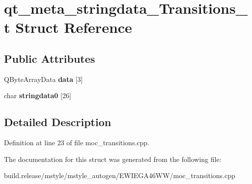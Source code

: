 \hypertarget{structqt__meta__stringdata___transitions__t}{}\section{qt\+\_\+meta\+\_\+stringdata\+\_\+\+Transitions\+\_\+t Struct Reference}
\label{structqt__meta__stringdata___transitions__t}
\subsection*{Public Attributes}
\begin{DoxyCompactItemize}
\item 
\mbox{\label{structqt__meta__stringdata___transitions__t_a26a5255698e0638a6a36d127ac968121}} 
Q\+Byte\+Array\+Data {\bfseries data} \mbox{[}3\mbox{]}
\item 
\mbox{\label{structqt__meta__stringdata___transitions__t_a0359efe1881ab36603b3039813944c89}} 
char {\bfseries stringdata0} \mbox{[}26\mbox{]}
\end{DoxyCompactItemize}


\subsection{Detailed Description}


Definition at line 23 of file moc\+\_\+transitions.\+cpp.



The documentation for this struct was generated from the following file\+:\begin{DoxyCompactItemize}
\item 
build.\+release/mstyle/mstyle\+\_\+autogen/\+E\+W\+I\+E\+G\+A46\+W\+W/moc\+\_\+transitions.\+cpp\end{DoxyCompactItemize}
